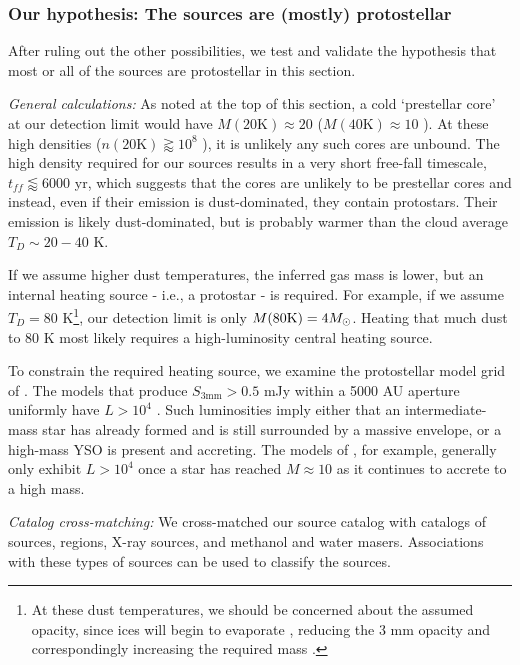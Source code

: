 \documentclass[twocolumn]{aastex61}
\begin{document}
\subsubsection{Our hypothesis: The sources are (mostly) protostellar}
\label{sec:theyareprotostars}
After ruling out the other possibilities, we test and validate the hypothesis
that most or all of the sources are protostellar in this section.


\emph{General calculations:}
As noted at the top of this section, a cold `prestellar core' at our detection
limit would have $M(20\mathrm{K})\approx20$ \msun ($M(40\mathrm{K})\approx10$
\msun).  At these high densities ($n(20 \mathrm{K})\gtrapprox10^8$ \percc), it
is unlikely any
such cores are unbound.  The high density required for our sources results in a very short
free-fall timescale, $t_{ff}\lessapprox6000$ yr, which suggests that the cores
are unlikely to be prestellar cores and instead, even if their emission is
dust-dominated, they contain protostars.  Their emission is likely
dust-dominated, but is probably warmer than the cloud average $T_D\sim20-40$ K.  

If we assume higher dust temperatures, the inferred gas mass is lower, but an
internal heating source - i.e., a protostar - is required.  For example,
if we assume $T_D=80$ K\footnote{At these dust temperatures,
we should be concerned about the assumed opacity, since ices
will begin to evaporate  \citep[e.g.,][]{Bergin1995a}, reducing the 3 mm
opacity and correspondingly increasing the required mass
\citep{Ossenkopf1994a}.  }, our detection limit is only $M(80\mathrm{K}) = 4
M_{\odot}$.  Heating that much dust to 80 K most likely requires a high-luminosity
central heating source.

To constrain the required heating source, we examine the protostellar model grid
of \citet{Robitaille2017a}.  The models that produce $S_{3 \mathrm{mm}} > 0.5$
mJy within a 5000 AU aperture uniformly have $L>10^4$ \lsun.  Such luminosities
imply either that an intermediate-mass star has already formed and is still
surrounded by a massive envelope, or a high-mass YSO is present and accreting.
The models of \citet{Zhang2015f}, for example, generally only exhibit $L>10^4$
\lsun once a star has reached $M\approx10$ \msun as it continues to accrete to
a high mass.



\emph{Catalog cross-matching:}
We cross-matched our source catalog with catalogs of \ammonia sources, \hii
regions, X-ray sources, and methanol and water masers.  Associations with these
types of sources can be used to classify the sources.
\end{document}
